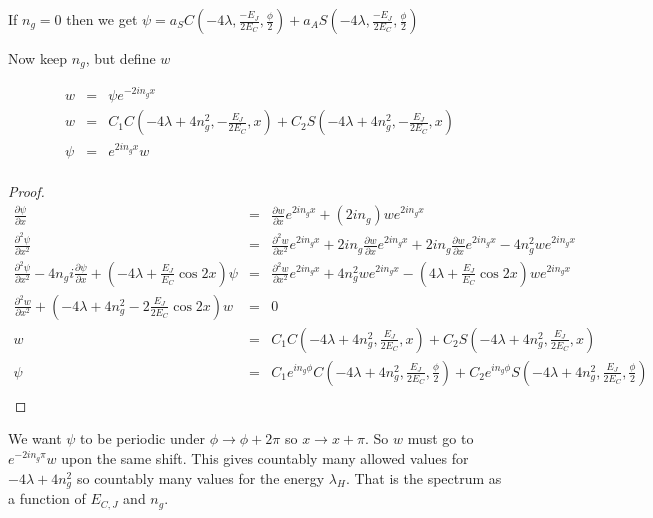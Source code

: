 \documentclass[11pt]{article}
\theoremstyle{change}
\theoremstyle{nonumberplain}
\newtheorem{proof}{Proof}
\numberwithin{equation}{section}
\begin{document}
If $n_g=0$ then we get $\psi = a_S C(-4 \lambda , \frac{-E_J}{2E_C} , \frac{\phi}{2} ) + a_A S(-4 \lambda , \frac{-E_J}{2E_C} , \frac{\phi}{2} )$

Now keep $n_g$, but define $w$

\begin{eqnarray*}
w &=& \psi e^{-2 i n_g x} \\
w &=& C_1 C( - 4 \lambda + 4 n_g^2 , - \frac{E_J}{2E_C} , x ) + C_2 S( - 4 \lambda + 4 n_g^2 , - \frac{E_J}{2E_C} , x ) \\
\psi &=& e^{2 i n_g x} w\\
\end{eqnarray*}

\begin{proof}
\begin{eqnarray*}
\frac{\partial \psi}{\partial x} &=& \frac{\partial w}{\partial x} e^{2 i n_g x} + (2 i n_g ) w e^{2 i n_g x}\\
\frac{\partial^2 \psi}{\partial x^2} &=& \frac{\partial^2 w}{\partial x^2} e^{2 i n_g x} + 2i n_g \frac{\partial w}{\partial x} e^{2 i n_g x} + 2 i n_g \frac{\partial w}{\partial x} e^{2 i n_g x} - 4 n_g^2 w e^{2 i n_g x}\\ 
\frac{\partial^2 \psi}{\partial x^2} - 4 n_g i \frac{\partial \psi}{\partial x} + (-4 \lambda + \frac{E_J}{E_C} \cos 2x ) \psi &=& \frac{\partial^2 w}{\partial x^2} e^{2 in_g x} + 4 n_g^2 w e^{2 i n_g x} - ( 4 \lambda + \frac{E_J}{E_C} \cos 2x ) w e^{2i n_g x}\\
\frac{\partial^2 w}{\partial x^2} + (-4 \lambda + 4 n_g^2 - 2 \frac{E_J}{2E_C} \cos 2x ) w &=& 0\\
w &=& C_1 C(-4 \lambda + 4 n_g^2 , \frac{E_J}{2 E_C} , x ) + C_2 S(-4 \lambda + 4 n_g^2 , \frac{E_J}{2 E_C} , x )\\
\psi &=& C_1 e^{i n_g \phi} C(-4 \lambda + 4 n_g^2 , \frac{E_J}{2 E_C} , \frac{\phi}{2} ) + C_2 e^{ i n_g \phi} S(-4 \lambda + 4 n_g^2 , \frac{E_J}{2 E_C} , \frac{\phi}{2} )\\
\end{eqnarray*}

\end{proof}

We want $\psi$ to be periodic under $\phi \to \phi + 2 \pi$ so $x \to x+ \pi$. So $w$ must go to $e^{-2 i n_g \pi}w $ upon the same shift. This gives countably many allowed values for $-4 \lambda + 4 n_g^2$ so countably many values for the energy $\lambda_H$. That is the spectrum as a function of $E_{C,J}$ and $n_g$.
\end{document}
